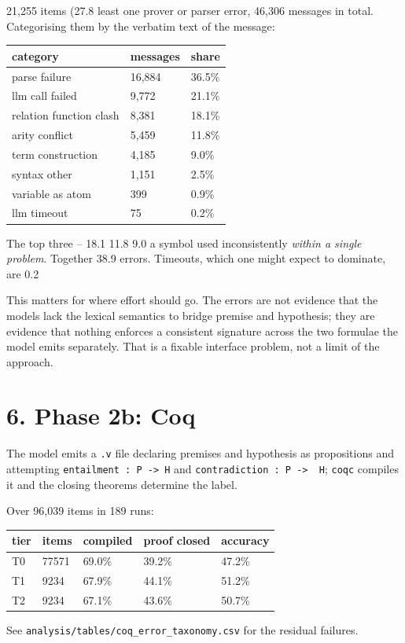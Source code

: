 \documentclass[11pt]{article}
\begin{document}
21,255 items (27.8%
least one prover or parser error, 46,306 messages in
total. Categorising them by the verbatim text of the message:

\begin{center}
\begin{tabular}{lll}
\hline
category & messages & share \\
\hline
parse failure & 16,884 & 36.5\% \\
llm call failed & 9,772 & 21.1\% \\
relation function clash & 8,381 & 18.1\% \\
arity conflict & 5,459 & 11.8\% \\
term construction & 4,185 & 9.0\% \\
syntax other & 1,151 & 2.5\% \\
variable as atom & 399 & 0.9\% \\
llm timeout & 75 & 0.2\% \\
\hline
\end{tabular}
\end{center}The top three -- 18.1%
11.8%
9.0%
a symbol used inconsistently \emph{within a single problem}. Together
38.9%
errors. Timeouts, which one might expect to dominate, are
0.2%

This matters for where effort should go. The errors are not evidence that
the models lack the lexical semantics to bridge premise and hypothesis;
they are evidence that nothing enforces a consistent signature across the
two formulae the model emits separately. That is a fixable interface
problem, not a limit of the approach.

\section{6. Phase 2b: Coq}

The model emits a \texttt{.v} file declaring premises and hypothesis as
propositions and attempting \texttt{entailment : P -> H} and \texttt{contradiction : P
-> ~H}; \texttt{coqc} compiles it and the closing theorems determine the label.

Over 96,039 items in 189 runs:

\begin{center}
\begin{tabular}{lllll}
\hline
tier & items & compiled & proof closed & accuracy \\
\hline
T0 & 77571 & 69.0\% & 39.2\% & 47.2\% \\
T1 & 9234 & 67.9\% & 44.1\% & 51.2\% \\
T2 & 9234 & 67.1\% & 43.6\% & 50.7\% \\
\hline
\end{tabular}
\end{center}See \texttt{analysis/tables/coq\_error_taxonomy.csv} for the residual failures.
\end{document}
